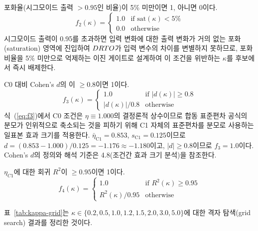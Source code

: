   포화율(시그모이드 출력 $> 0.95$인 비율)이 5\% 미만이면 1, 아니면 0이다.
    \begin{equation}
      f_2(\kappa) = \begin{cases}
        1.0 & \text{if sat}(\kappa) < 5\% \\
        0.0 & \text{otherwise}
      \end{cases}
      \label{eq:f2}
    \end{equation}
    시그모이드 출력이 0.95를 초과하면 입력 변화에 대한 출력 변화가 거의 없는 포화(saturation)
    영역에 진입하여 $DRTO$가 입력 변수의 차이를 변별하지 못하므로, 포화 비율을 5\% 미만으로
    억제하는 이진 게이트로 설계하여 이 조건을 위반하는 $\kappa$를 후보에서 즉시 배제한다.

  C0 대비 Cohen's $d$의 이 $\geq 0.8$이면 1이다.
    \begin{equation}
      f_3(\kappa) = \begin{cases}
        1.0 & \text{if } |d(\kappa)| \geq 0.8 \\
        |d(\kappa)| / 0.8 & \text{otherwise}
      \end{cases}
      \label{eq:f3}
    \end{equation}
    식~(\ref{eq:f3})에서 C0 조건은 $\eta \equiv 1.000$의 결정론적 상수이므로 합동 표준편차 공식의 분모가
    인위적으로 축소되는 것을 피하기 위해 C1 자체의 표준편차를 분모로 사용하는 일표본 효과
    크기를 적용한다. $\bar{\eta}_{\text{C1}} = 0.853$, $s_{\text{C1}} = 0.125$이므로
    $d = (0.853 - 1.000)/0.125 = -1.176 \approx -1.180$이고, $|d| \geq 0.8$이므로 $f_3 = 1.0$이다. Cohen's $d$의 정의와 해석 기준은 4.8(조건간 효과 크기 분석)을 참조한다.

  $\eta_{C1}$에 대한 회귀 $R^2$이 $\geq 0.95$이면 1이다.
    \begin{equation}
      f_4(\kappa) = \begin{cases}
        1.0 & \text{if } R^2(\kappa) \geq 0.95 \\
        R^2(\kappa) / 0.95 & \text{otherwise}
      \end{cases}
      \label{eq:f4}
    \end{equation}

\p{[}표~\ref{tab:kappa-grid}\p{]}는 $\kappa \in \{0.2, 0.5, 1.0, 1.2, 1.5, 2.0, 3.0, 5.0\}$에
대한 격자 탐색(grid search) 결과를 정리한 것이다.

